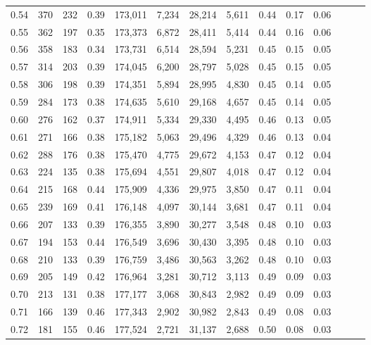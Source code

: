 \begin{tabular}{rrrrrrrrrrrrrr}
0.54 &    370 &  232 &  0.39 &  173,011 &    7,234 &  28,214 &   5,611 &  0.44 &  0.17 &      0.06 \\
0.55 &    362 &  197 &  0.35 &  173,373 &    6,872 &  28,411 &   5,414 &  0.44 &  0.16 &      0.06 \\
0.56 &    358 &  183 &  0.34 &  173,731 &    6,514 &  28,594 &   5,231 &  0.45 &  0.15 &      0.05 \\
0.57 &    314 &  203 &  0.39 &  174,045 &    6,200 &  28,797 &   5,028 &  0.45 &  0.15 &      0.05 \\
0.58 &    306 &  198 &  0.39 &  174,351 &    5,894 &  28,995 &   4,830 &  0.45 &  0.14 &      0.05 \\
0.59 &    284 &  173 &  0.38 &  174,635 &    5,610 &  29,168 &   4,657 &  0.45 &  0.14 &      0.05 \\
0.60 &    276 &  162 &  0.37 &  174,911 &    5,334 &  29,330 &   4,495 &  0.46 &  0.13 &      0.05 \\
0.61 &    271 &  166 &  0.38 &  175,182 &    5,063 &  29,496 &   4,329 &  0.46 &  0.13 &      0.04 \\
0.62 &    288 &  176 &  0.38 &  175,470 &    4,775 &  29,672 &   4,153 &  0.47 &  0.12 &      0.04 \\
0.63 &    224 &  135 &  0.38 &  175,694 &    4,551 &  29,807 &   4,018 &  0.47 &  0.12 &      0.04 \\
0.64 &    215 &  168 &  0.44 &  175,909 &    4,336 &  29,975 &   3,850 &  0.47 &  0.11 &      0.04 \\
0.65 &    239 &  169 &  0.41 &  176,148 &    4,097 &  30,144 &   3,681 &  0.47 &  0.11 &      0.04 \\
0.66 &    207 &  133 &  0.39 &  176,355 &    3,890 &  30,277 &   3,548 &  0.48 &  0.10 &      0.03 \\
0.67 &    194 &  153 &  0.44 &  176,549 &    3,696 &  30,430 &   3,395 &  0.48 &  0.10 &      0.03 \\
0.68 &    210 &  133 &  0.39 &  176,759 &    3,486 &  30,563 &   3,262 &  0.48 &  0.10 &      0.03 \\
0.69 &    205 &  149 &  0.42 &  176,964 &    3,281 &  30,712 &   3,113 &  0.49 &  0.09 &      0.03 \\
0.70 &    213 &  131 &  0.38 &  177,177 &    3,068 &  30,843 &   2,982 &  0.49 &  0.09 &      0.03 \\
0.71 &    166 &  139 &  0.46 &  177,343 &    2,902 &  30,982 &   2,843 &  0.49 &  0.08 &      0.03 \\
0.72 &    181 &  155 &  0.46 &  177,524 &    2,721 &  31,137 &   2,688 &  0.50 &  0.08 &      0.03 \\

\end{tabular}
